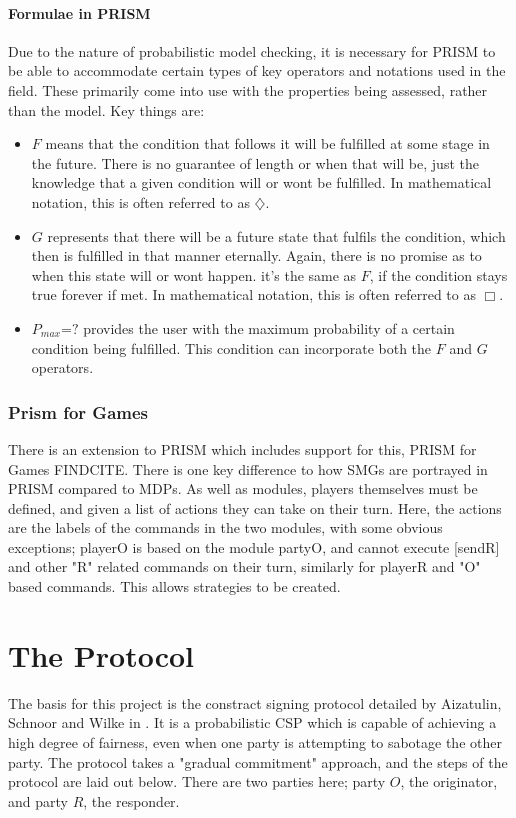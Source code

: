 \documentclass{l4proj}
\begin{document}
\subsubsection{Formulae in PRISM}

Due to the nature of probabilistic model checking, it is necessary for PRISM to be able to accommodate certain types of key operators and notations used in the field. These primarily come into use with the properties being assessed, rather than the model. Key things are:
\begin{itemize}
\item $F$ means that the condition that follows it will be fulfilled at some stage in the future. There is no guarantee of length or when that will be, just the knowledge that a given condition will or wont be fulfilled. In mathematical notation, this is often referred to as $\diamondsuit$.
\item $G$ represents that there will be a future state that fulfils the condition, which then is fulfilled in that manner eternally. Again, there is no promise as to when this state will or wont happen. it's the same as $F$, if the condition stays true forever if met. In mathematical notation, this is often referred to as $\Box$.
\item $P{_{max}}$=$?$ provides the user with the maximum probability of a certain condition being fulfilled. This condition can incorporate both the $F$ and $G$ operators. 
\end{itemize}

\subsection{Prism for Games}
There is an extension to PRISM which includes support for this, PRISM for Games {FINDCITE}. There is one key difference to how SMGs are portrayed in PRISM compared to MDPs. As well as modules, players themselves must be defined, and given a list of actions they can take on their turn. Here, the actions are the labels of the commands in the two modules, with some obvious exceptions; playerO is based on the module partyO, and cannot execute [sendR] and other "R" related commands on their turn, similarly for playerR and "O" based commands. This allows strategies to be created.


\chapter{The Protocol}
The basis for this project is the constract signing protocol detailed by Aizatulin, Schnoor and Wilke in \cite{ASW09}. It is a probabilistic CSP which is capable of achieving a high degree of fairness, even when one party is attempting to sabotage the other party. The protocol takes a "gradual commitment" approach, and the steps of the protocol are laid out below. There are two parties here; party $O$, the originator, and party $R$, the responder.
\end{document}
